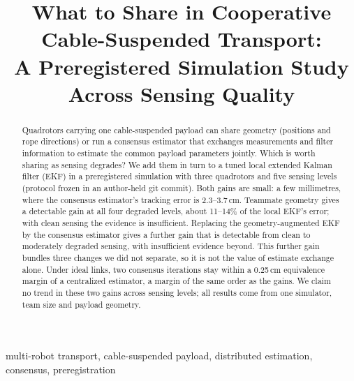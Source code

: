 \documentclass[conference]{IEEEtran}
\begin{document}
\title{What to Share in Cooperative\\ Cable-Suspended Transport:\\
A Preregistered Simulation Study\\ Across Sensing Quality}

\author{
}

\maketitle

\begin{abstract}
Quadrotors carrying one cable-suspended payload can share geometry (positions and rope directions) or run a consensus estimator that exchanges measurements and filter information to estimate the common payload parameters jointly. Which is worth sharing as sensing degrades? We add them in turn to a tuned local extended Kalman filter (EKF) in a preregistered simulation with three quadrotors and five sensing levels (protocol frozen in an author-held git commit). Both gains are small: a few millimetres, where the consensus estimator's tracking error is 2.3--3.7\,cm. Teammate geometry gives a detectable gain at all four degraded levels, about 11--14\% of the local EKF's error; with clean sensing the evidence is insufficient. Replacing the geometry-augmented EKF by the consensus estimator gives a further gain that is detectable from clean to moderately degraded sensing, with insufficient evidence beyond. This further gain bundles three changes we did not separate, so it is not the value of estimate exchange alone. Under ideal links, two consensus iterations stay within a 0.25\,cm equivalence margin of a centralized estimator, a margin of the same order as the gains. We claim no trend in these two gains across sensing levels; all results come from one simulator, team size and payload geometry.
\end{abstract}

\begin{IEEEkeywords}
multi-robot transport, cable-suspended payload, distributed estimation, consensus, preregistration
\end{IEEEkeywords}
\end{document}
